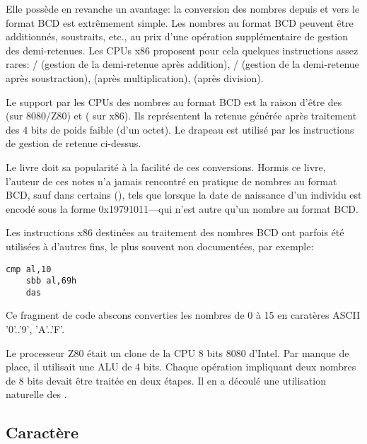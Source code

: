 Elle possède en revanche un avantage: la conversion des nombres depuis et vers le format \ac{BCD} est extrêmement simple.
Les nombres au format BCD peuvent être additionnés, soustraits, etc., au prix d'une opération supplémentaire de gestion des demi-retenues.
Les CPUs x86 proposent pour cela quelques instructions assez rares:
/ (gestion de la demi-retenue après addition),
/ (gestion de la demi-retenue après soustraction),
 (après multiplication),
 (après division).

Le support par les CPUs des nombres au format \ac{BCD} est la raison d'être des  (sur 8080/Z80) et
 ( sur x86).
Ils représentent la retenue générée après traitement des 4 bits de poids faible (d'un octet).
Le drapeau est utilisé par les instructions de gestion de retenue ci-dessus.

Le livre  doit sa popularité à la facilité de ces conversions.
Hormis ce livre, l'auteur de ces notes n'a jamais rencontré en pratique de nombres au format \ac{BCD}, sauf dans certains
 (),
tels que lorsque la date de naissance d'un individu est encodé sous la forme 0x19791011---qui n'est autre qu'un nombre au format \ac{BCD}.

Les instructions x86 destinées au traitement des nombres \ac{BCD} ont parfois été utilisées à d'autres fins, le plus souvent non documentées, par exemple:

\begin{lstlisting}[style=customasmx86]
	cmp al,10
	sbb al,69h
	das
\end{lstlisting}

Ce fragment de code abscons converties les nombres de 0 à 15 en caratères \ac{ASCII} '0'..'9', 'A'..'F'.


Le processeur Z80 était un clone de la CPU 8 bits 8080 d'Intel. Par manque de place, il utilisait une \ac{ALU} de 4 bits.
Chaque opération impliquant deux nombres de 8 bits devait être traitée en deux étapes.
Il en a découlé une utilisation naturelle des .

\subsection{Caractère}

